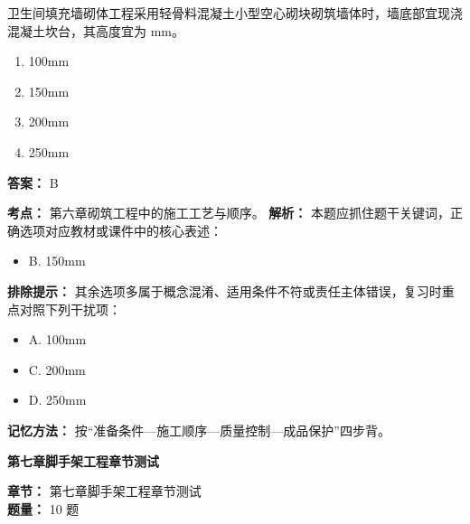 \documentclass[UTF8,fontset=fandol,11pt]{ctexart}
\newcommand{\chaptertitle}[1]{\vspace{0.5em}\begin{tcolorbox}[enhanced,colback=deepblue,colframe=deepblue,arc=2mm,boxrule=0pt]\begin{center}\Large\bfseries\color{white}#1\end{center}\end{tcolorbox}\vspace{0.5em}}
\begin{document}
\begin{quizbox}[title={第 31 题}]
卫生间填充墙砌体工程采用轻骨料混凝土小型空心砌块砌筑墙体时，墙底部宜现浇混凝土坎台，其高度宜为 mm。\\
\begin{enumerate}[label=\Alph*.]
\item 100mm
\item 150mm
\item 200mm
\item 250mm
\end{enumerate}
\textbf{答案：} B
\vspace{0.25em}
\begin{answerbox}[title={考点解析}]
\textbf{考点：} 第六章砌筑工程中的施工工艺与顺序。
\textbf{解析：} 本题应抓住题干关键词，正确选项对应教材或课件中的核心表述：
\begin{itemize}
\item B. 150mm
\end{itemize}
\textbf{排除提示：} 其余选项多属于概念混淆、适用条件不符或责任主体错误，复习时重点对照下列干扰项：
\begin{itemize}
\item A. 100mm
\item C. 200mm
\item D. 250mm
\end{itemize}
\textbf{记忆方法：} 按“准备条件—施工顺序—质量控制—成品保护”四步背。
\end{answerbox}
\end{quizbox}

\vspace{0.2em}

\chaptertitle{第七章脚手架工程章节测试}
\begin{mainbox}
\textbf{\textcolor{mainblue}{章节：}} 第七章脚手架工程章节测试\\
\textbf{\textcolor{answerred}{题量：}} 10 题
\end{mainbox}
\end{document}
